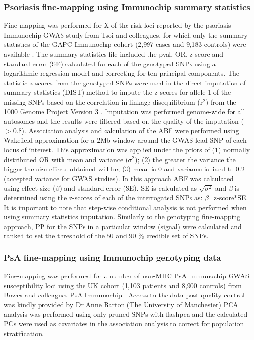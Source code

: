 \subsubsection{Psoriasis fine-mapping using Immunochip summary statistics}
Fine mapping was performed for X of the risk loci reported by the psoriasis Immunochip GWAS study from Tsoi and colleagues, for which only the summary statistics of the GAPC Immunochip cohort (2,997 cases and 9,183 controls) were available \parencite{Tsoi2012}. The summary statistics file included the pval, OR, z-score and standard error (SE) calculated for each of the genotyped SNPs using a logarithmic regression model and correcting for ten principal components. The statistic z-scores from the genotyped SNPs were used in the direct imputation of summary statistics (DIST) method to impute the z-scores for allele 1 of the missing SNPs based on the correlation in linkage disequilibrium (r$^2$) from the 1000 Genome Project Version 3 \parencite{Lee2013}. Imputation was performed genome-wide for all autosomes and the results were filtered based on the quality of the imputation ($>$0.8). Association analysis and calculation of the ABF were performed using Wakefield approximation for a 2Mb window around the GWAS lead SNP of each locus of interest. This approximation was applied under the priors of (1) normally distributed OR with mean and variance ($\sigma^2$); (2) the greater the variance the bigger the size effects obtained will be; (3) mean is 0 and variance is fixed to 0.2 (accepted variance for GWAS studies). In this approach ABF was calculated using effect size ($\beta$) and standard error (SE). SE is calculated as $\sqrt{\sigma^2}$ and $\beta$ is determined using the z-scores of each of the interrogated SNPs as: $\beta$=z-score$\ast$SE. It is important to note that step-wise conditional analysis is not performed when using summary statistics imputation. Similarly to the genotyping fine-mapping approach, PP for the SNPs in a particular window (signal) were calculated and ranked to set the threshold of the 50 and 90 \% credible set of SNPs. 

\subsubsection{PsA fine-mapping using Immunochip genotyping data}
Fine-mapping was performed for a number of non-MHC PsA Immunochip GWAS susceptibility loci using the UK cohort (1,103 patients and 8,900 controls) from Bowes and colleagues PsA Immunochip \parencite{Bowes2015}. Access to the data post-quality control was kindly provided by Dr Anne Barton (The University of Manchester) PCA analysis was performed using only pruned SNPs with flashpca \parencite{Abraham2014} and the calculated PCs were used as covariates in the association analysis to correct for population stratification. 

